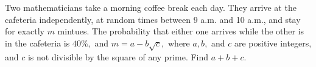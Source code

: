 Two mathematicians take a morning coffee break each day.  They arrive at the cafeteria independently, at random times between 9 a.m. and 10 a.m., and stay for exactly $m$ mintues.  The probability that either one arrives while the other is in the cafeteria is $40 \%,$ and $m=a-b\sqrt{c},$ where $a, b,$ and $c$ are positive integers, and $c$ is not divisible by the square of any prime.  Find $a+b+c.$